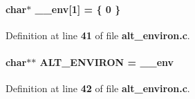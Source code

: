 \paragraph[{\+\_\+\+\_\+env}]{\setlength{\rightskip}{0pt plus 5cm}char$\ast$ \+\_\+\+\_\+env[1] = \{ 0 \}}\label{alt__environ_8c_a5428d66981cb84e60b899495874618b2}


Definition at line {\bf 41} of file {\bf alt\+\_\+environ.\+c}.

\paragraph[{A\+L\+T\+\_\+\+E\+N\+V\+I\+R\+ON}]{\setlength{\rightskip}{0pt plus 5cm}char$\ast$$\ast$ A\+L\+T\+\_\+\+E\+N\+V\+I\+R\+ON = {\bf \+\_\+\+\_\+env}}\label{alt__environ_8c_a0d658dca918111b92913e7cffed39fcf}


Definition at line {\bf 42} of file {\bf alt\+\_\+environ.\+c}.

